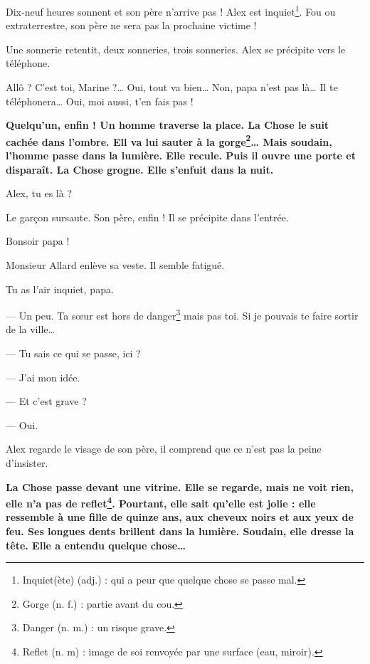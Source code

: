 Dix-neuf heures sonnent et son père n'arrive pas ! Alex est inquiet\footnote{Inquiet(ète) (adj.) : qui a peur que quelque chose se
passe mal.}. Fou ou extraterrestre, son père ne sera pas la prochaine victime !

Une sonnerie retentit, deux sonneries, trois sonneries. Alex se précipite vers le téléphone.

\og Allô ? C'est toi, Marine ?\ldots{} Oui, tout va bien\ldots{} Non, papa n'est pas là\ldots{} Il te téléphonera\ldots{} Oui, moi
aussi, t'en fais pas ! \fg{}

\textbf{Quelqu'un, enfin ! Un homme traverse la place. La Chose le suit cachée dans l'ombre. Ell va lui sauter à la
gorge\footnote{Gorge (n. f.) : partie avant du cou.}\ldots{} Mais soudain, l'homme passe dans la lumière. Elle recule. Puis il
ouvre une porte et disparaît. La Chose grogne. Elle s'enfuit dans la nuit.}

\og Alex, tu es là ? \fg{}

Le gar\c{c}on sursaute. Son père, enfin ! Il se précipite dans l'entrée.

\og Bonsoir papa ! \fg{}

Monsieur Allard enlève sa veste. Il semble fatigué.

\og Tu as l'air inquiet, papa.

--- Un peu. Ta s\oe{}ur est hors de danger\footnote{Danger (n. m.) : un risque grave.} mais pas toi. Si je pouvais te faire sortir
    de la ville\ldots{}

--- Tu sais ce qui se passe, ici ?

--- J'ai mon idée.

--- Et c'est grave ?

--- Oui. \fg{}

Alex regarde le visage de son père, il comprend que ce n'est pas la peine d'insister.

\textbf{La Chose passe devant une vitrine. Elle se regarde, mais ne voit rien, elle n'a pas de reflet\footnote{Reflet (n. m) :
image de soi renvoyée par une surface (eau, miroir).}. Pourtant, elle sait qu'elle est jolie : elle ressemble à une fille de quinze ans,
aux cheveux noirs et aux yeux de feu. Ses longues dents brillent dans la lumière. Soudain, elle dresse la tête. Elle a entendu
quelque chose\ldots{}}
